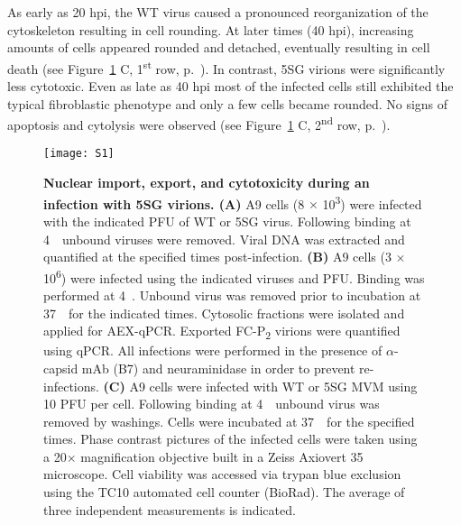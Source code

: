 As early as 20 hpi, the WT virus caused a pronounced reorganization of the cytoskeleton resulting in cell rounding. At later times (40 hpi), increasing amounts of cells appeared rounded and detached, eventually resulting in cell death (see Figure~\ref{S1} C, 1\textsuperscript{st} row, p.~\pageref{S1}). In contrast, 5SG virions were significantly less cytotoxic. Even as late as 40 hpi most of the infected cells still exhibited the typical fibroblastic phenotype and only a few cells became rounded. No signs of apoptosis and cytolysis were observed (see Figure~\ref{S1} C, 2\textsuperscript{nd} row, p.~\pageref{S1}). 

\begin{figure}[b!]
\centering
  \texttt{[image: S1]} \\[0.3cm]
  \caption[Nuclear Import, Export, and Cytotoxicity During an Infection with 5SG Virions]
   {\textbf{Nuclear import, export, and cytotoxicity during an infection with 5SG virions. (A)} A9 cells (8 $\times$ 10\textsuperscript{3}) were infected with the indicated PFU of WT or 5SG virus. Following binding at \mbox{4 \textcelsius}~unbound viruses were removed. Viral DNA was extracted and quantified at the specified times post-infection. \textbf{(B)} A9 cells (3 $\times$ 10\textsuperscript{6}) were infected using the indicated viruses and PFU. Binding was performed at \mbox{4 \textcelsius}. Unbound virus was removed prior to incubation at \mbox{37 \textcelsius}~for the indicated times. Cytosolic fractions were isolated and applied for AEX-qPCR. Exported FC-P\textsubscript{2} virions were quantified using qPCR. All infections were performed in the presence of $\alpha$-capsid mAb (B7) and neuraminidase in order to prevent re-infections. \textbf{(C)} A9 cells were infected with WT or 5SG MVM using 10 PFU per cell. Following binding at \mbox{4 \textcelsius}~unbound virus was removed by washings. Cells were incubated at \mbox{37 \textcelsius}~for the specified times. Phase contrast pictures of the infected cells were taken using a 20$\times$ magnification objective built in a Zeiss Axiovert 35 microscope. Cell viability was accessed via trypan blue exclusion using the TC10\textsuperscript{\texttrademark} automated cell counter (BioRad). The average of three independent measurements is indicated.} 
\label{S1}
\end{figure}

